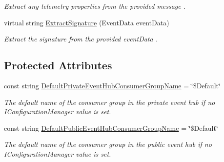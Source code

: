 \begin{DoxyCompactItemize}
\begin{DoxyCompactList}\small\item\em Extract any telemetry properties from the provided {\itshape message} . \end{DoxyCompactList}\item 
virtual string \hyperlink{classCqrs_1_1Azure_1_1ServiceBus_1_1AzureEventHub_ac22def26cc02c95c6337be7d87854192_ac22def26cc02c95c6337be7d87854192}{Extract\+Signature} (Event\+Data event\+Data)
\begin{DoxyCompactList}\small\item\em Extract the signature from the provided {\itshape event\+Data} . \end{DoxyCompactList}\end{DoxyCompactItemize}
\subsection*{Protected Attributes}
\begin{DoxyCompactItemize}
\item 
const string \hyperlink{classCqrs_1_1Azure_1_1ServiceBus_1_1AzureEventHub_a523df6f08c43b3ca013c08555098f4ad_a523df6f08c43b3ca013c08555098f4ad}{Default\+Private\+Event\+Hub\+Consumer\+Group\+Name} = \char`\"{}\$Default\char`\"{}
\begin{DoxyCompactList}\small\item\em The default name of the consumer group in the private event hub if no I\+Configuration\+Manager value is set. \end{DoxyCompactList}\item 
const string \hyperlink{classCqrs_1_1Azure_1_1ServiceBus_1_1AzureEventHub_a71191dfe0cccbbc59c37cadf051a5cdd_a71191dfe0cccbbc59c37cadf051a5cdd}{Default\+Public\+Event\+Hub\+Consumer\+Group\+Name} = \char`\"{}\$Default\char`\"{}
\begin{DoxyCompactList}\small\item\em The default name of the consumer group in the public event hub if no I\+Configuration\+Manager value is set. \end{DoxyCompactList}\end{DoxyCompactItemize}
